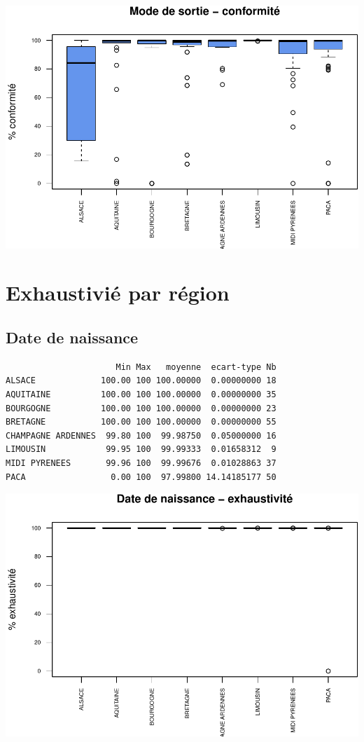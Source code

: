 \documentclass[]{article}
\begin{document}
\includegraphics{septembre2015_files/figure-latex/unnamed-chunk-28-1.pdf}

\section{Exhaustivié par région}\label{exhaustivie-par-region}

\subsection{Date de naissance}\label{date-de-naissance-2}

\begin{verbatim}
                      Min Max   moyenne  ecart-type Nb
ALSACE             100.00 100 100.00000  0.00000000 18
AQUITAINE          100.00 100 100.00000  0.00000000 35
BOURGOGNE          100.00 100 100.00000  0.00000000 23
BRETAGNE           100.00 100 100.00000  0.00000000 55
CHAMPAGNE ARDENNES  99.80 100  99.98750  0.05000000 16
LIMOUSIN            99.95 100  99.99333  0.01658312  9
MIDI PYRENEES       99.96 100  99.99676  0.01028863 37
PACA                 0.00 100  97.99800 14.14185177 50
\end{verbatim}

\includegraphics{septembre2015_files/figure-latex/unnamed-chunk-29-1.pdf}
\end{document}
